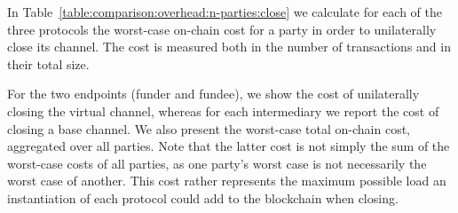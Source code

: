   In Table~\ref{table:comparison:overhead:n-parties:close} we
  calculate for each of the three protocols the worst-case on-chain cost for a party
  in order to unilaterally close its channel. The cost is
  measured both in the number of transactions and in their total size.

  For the two endpoints (funder and fundee), we show the cost of unilaterally
  closing the virtual channel, whereas for each intermediary we
  report the cost of closing a base channel. We also present the worst-case
  total on-chain cost,
  aggregated over all parties. Note that the latter cost is not simply the sum
  of the worst-case costs of all parties, as one party's worst case is not
  necessarily the worst case of another. This cost rather represents the maximum
  possible load an instantiation of each protocol could add to the blockchain
  when closing.

